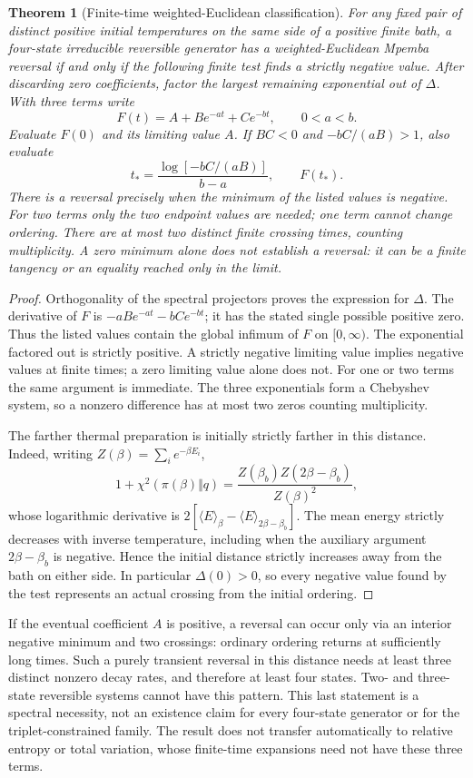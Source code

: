 \documentclass[11pt]{article}
\newtheorem{theorem}{Theorem}
\begin{document}
\begin{theorem}[Finite-time weighted-Euclidean classification]\label{thm:finitechi}
For any fixed pair of distinct positive initial temperatures on the same side
of a positive finite bath, a four-state irreducible reversible generator has
a weighted-Euclidean Mpemba reversal if and only if the following finite test
finds a strictly negative value. After discarding zero coefficients, factor
the largest remaining exponential out of $\Delta$. With three terms write
\[
F(t)=A+B e^{-at}+C e^{-bt},\qquad0<a<b.
\]
Evaluate $F(0)$ and its limiting value $A$. If $BC<0$ and
$-bC/(aB)>1$, also evaluate
\[
t_* =\frac{\log[-bC/(aB)]}{b-a},\qquad F(t_*).
\]
There is a reversal precisely when the minimum of the listed values is
negative. For two terms only the two endpoint values are needed; one term
cannot change ordering. There are at most two distinct finite crossing
times, counting multiplicity. A zero minimum alone does not establish a
reversal: it can be a finite tangency or an equality reached only in the limit.
\end{theorem}
\begin{proof}
Orthogonality of the spectral projectors proves the expression for $\Delta$.
The derivative of $F$ is
$-aB e^{-at}-bC e^{-bt}$; it has the stated single possible positive zero.
Thus the listed values contain the global infimum of $F$ on $[0,\infty)$.
The exponential factored out is strictly positive. A strictly negative
limiting value implies negative values at finite times; a zero limiting
value alone does not. For one or two terms the same argument is immediate.
The three exponentials form a Chebyshev system, so a nonzero difference has
at most two zeros counting multiplicity.

The farther thermal preparation is initially strictly farther in this
distance. Indeed, writing $Z(\beta)=\sum_i e^{-\beta E_i}$,
\[
1+\chi^2(\pi(\beta)\Vert q)
=\frac{Z(\beta_b)Z(2\beta-\beta_b)}{Z(\beta)^2},
\]
whose logarithmic derivative is
$2[\langle E\rangle_\beta-\langle E\rangle_{2\beta-\beta_b}]$.
The mean energy strictly decreases with inverse temperature, including when
the auxiliary argument $2\beta-\beta_b$ is negative. Hence the initial
distance strictly increases away from the bath on either side. In
particular $\Delta(0)>0$, so every negative value found by the test represents
an actual crossing from the initial ordering.
\end{proof}

If the eventual coefficient $A$ is positive, a reversal can occur only via
an interior negative minimum and two crossings: ordinary ordering returns
at sufficiently long times. Such a purely transient reversal in this
distance needs at least three distinct nonzero decay rates, and therefore
at least four states. Two- and three-state reversible systems cannot have
this pattern. This last statement is a spectral necessity, not an existence
claim for every four-state generator or for the triplet-constrained family.
The result does not transfer automatically to relative entropy or total
variation, whose finite-time expansions need not have these three terms.
\end{document}
